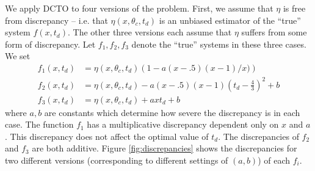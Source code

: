 \documentclass[twocolumn,10pt]{asme2ej}
\begin{document}
% 
We apply DCTO to four versions of the problem.
%
First, we assume that $\eta$ is free from discrepancy -- i.e. that $\eta(x,\theta_c,t_d)$ is an unbiased estimator of the ``true'' system $f(x,t_d)$.
%
The other three versions each assume that $\eta$ suffers from some form of discrepancy.
%
Let $f_1,f_2,f_3$ denote the ``true'' systems in these three cases.
%
We set 
%
\begin{align}
	f_1(x,t_d) &= \eta(x,\theta_c,t_d) \left(1-a(x-.5)(x-1)/x) \right)\label{eq:objs1} \\
	f_2(x,t_d)&= \eta(x,\theta_c,t_d) - a(x-.5)(x-1)\left(t_d-\frac43\right)^2 + b\label{eq:objs2}\\
	f_3(x,t_d)&=\eta(x,\theta_c,t_d) + axt_d+b\label{eq:objs3}
\end{align}
%
where $a,b$ are constants which determine how severe the discrepancy is in each case. 
%
The function $f_1$ has a multiplicative discrepancy dependent only on $x$ and $a$. 
%
This discrepancy does not affect the optimal value of $t_d$.  
%
The discrepancies of $f_2$ and $f_3$ are both additive.
%
Figure \ref{fig:discrepancies} shows the discrepancies for two different versions (corresponding to different settings of $(a,b)$) of each $f_i$.
%
\end{document}
